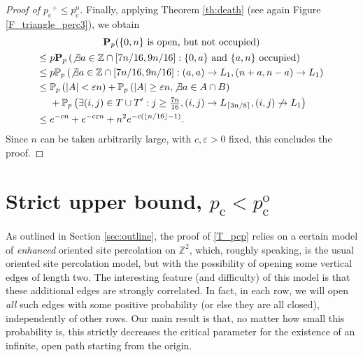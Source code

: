 \documentclass[pdflatex,sn-mathphys-num]{sn-jnl}%
\newcommand{\bbP}{{\ensuremath{\mathbb P}} }
\newcommand{\bbZ}{{\ensuremath{\mathbb Z}} }
\newcommand{\bfP}{\mathbf{P}}
\newcommand{\1}{{\ensuremath{\mathbf{1}}} }
\newcommand{\pc}{\ensuremath{p_{\mathrm{c}} }}
\newcommand{\pco}{\ensuremath{p_{\mathrm{c}}^{\mathrm{o}} }}
\theoremstyle{thmstyleone}%
\theoremstyle{thmstyletwo}%
\theoremstyle{thmstylethree}%
\begin{document}
\begin{proof}[Proof of $\pc^+\le \pco$]
Finally, applying Theorem \ref{th:death} (see again  Figure \ref{F_triangle_perc3}), we obtain
\begin{multline*}
\bfP_p(\{0,n\}\text{ is open, but not occupied})\\
\begin{aligned}
\le{}& p\bfP_p\left(\not\exists a\in\bbZ\cap[7n/16,9n/16]: \{0,a\} \text{ and } \{a,n\} \text{ {occupied}}\right)\\
\le{}& p\bbP_p\left(\not\exists a\in\bbZ\cap[7n/16,9n/16]:(a,a)\to L_1,(n+a,n-a)\to L_1\right)\\
\le{}& \bbP_p\left(|A|<\varepsilon n\right)+\bbP_{p}\left(|A|\ge \varepsilon n,\not\exists a\in A \cap B \right) \\
&{}+ \bbP_p\left(\exists (i,j) \in T\cup T'
: j \geq \tfrac{7n}{16}, (i,j) \to L_{\lceil 3n/8\rceil}, (i,j) \not\to L_1\right)\\
\le{}& e^{-cn}+e^{-c\varepsilon n}+n^2e^{-c(\lfloor n/16\rfloor-1)}.\end{aligned}\end{multline*}
Since $n$ can be taken arbitrarily large, with $c,\varepsilon>0$ fixed, this 
concludes the proof.
\end{proof}




\section{Strict upper bound, 
\texorpdfstring{$\pc<\pco$}{pc<pco}}
\label{sec:main}

As outlined in Section \ref{sec:outline}, the proof of \eqref{T_pcp} relies on a certain model of {\it enhanced}  oriented site percolation on $\mathbb Z^{2}$, which, roughly speaking, is the usual oriented site percolation model, but with the possibility of opening some vertical edges of length two. The interesting feature (and difficulty) of this model is that these additional edges are strongly correlated. In fact, in each row, we will open {\it all} such edges with some positive probability
(or else they are all closed), independently of other rows. Our main result is that, no matter how small this probability is, this strictly decreases the critical parameter for the existence of an infinite, open path starting from the origin. 
\end{document}
